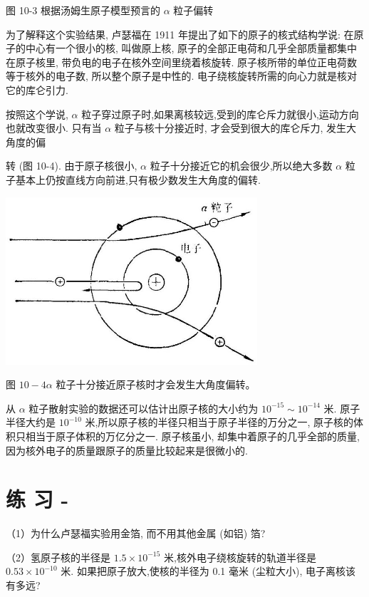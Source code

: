 \documentclass[10pt]{article}
\begin{document}
图 10-3 根据汤姆生原子模型预言的 \(\alpha\) 粒子偏转

为了解释这个实验结果, 卢瑟福在 1911 年提出了如下的原子的核式结构学说: 在原子的中心有一个很小的核, 叫做原上核, 原子的全部正电荷和几乎全部质量都集中在原子核里, 带负电的电子在核外空间里绕着核旋转. 原子核所带的单位正电荷数等于核外的电子数, 所以整个原子是中性的. 电子绕核旋转所需的向心力就是核对它的库仑引力.

按照这个学说, \(\alpha\) 粒子穿过原子时,如果离核较远,受到的库仑斥力就很小,运动方向也就改变很小. 只有当 \(\alpha\) 粒子与核十分接近时, 才会受到很大的库仑斥力, 发生大角度的偏

转 (图 10-4). 由于原子核很小, \(\alpha\) 粒子十分接近它的机会很少,所以绝大多数 \(\alpha\) 粒子基本上仍按直线方向前进,只有极少数发生大角度的偏转.

\begin{center}
\includegraphics[max width=0.7\textwidth]{images/01913056-1f15-74d8-9184-9aab52c9d66b_330_218607.jpg}
\end{center}

图 \({10} - {4\alpha }\) 粒子十分接近原子核时才会发生大角度偏转。

从 \(\alpha\) 粒子散射实验的数据还可以估计出原子核的大小约为 \({10}^{-{15}} \sim {10}^{-{14}}\) 米. 原子半径大约是 \({10}^{-{10}}\) 米,所以原子核的半径只相当于原子半径的万分之一, 原子核的体积只相当于原子体积的万亿分之一. 原子核虽小, 却集中着原子的几乎全部的质量, 因为核外电子的质量跟原子的质量比较起来是很微小的.

\section*{练 习 -}

（1）为什么卢瑟福实验用金箔, 而不用其他金属 (如铝) 箔?

（2）氢原子核的半径是 \({1.5} \times {10}^{-{15}}\) 米,核外电子绕核旋转的轨道半径是 \({0.53} \times {10}^{-{10}}\) 米. 如果把原子放大,使核的半径为 0.1 毫米 (尘粒大小), 电子离核该有多远?
\end{document}
